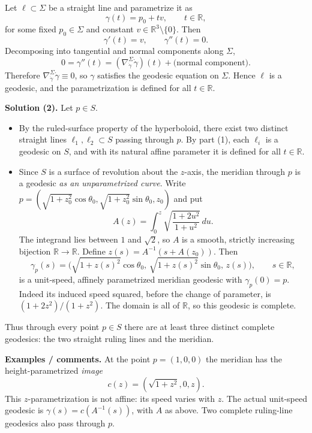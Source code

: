 \begin{solution}
Let $\ell\subset\Sigma$ be a straight line and parametrize it as
	\[
	\gamma(t) = p_0 + t v,\qquad t\in\mathbb R,
	\]
	for some fixed $p_0\in\Sigma$ and constant $v\in\mathbb R^3\setminus\{0\}$.
	Then
	\[
	\gamma'(t)=v,\qquad \gamma''(t)=0.
	\]
	Decomposing into tangential and normal components along $\Sigma$,
	\[
	0 = \gamma''(t) = (\nabla^{\Sigma}_{\dot\gamma}\dot\gamma)(t)
	+ \text{(normal component)}.
	\]
	Therefore $\nabla^{\Sigma}_{\dot\gamma}\dot\gamma\equiv0$, so $\gamma$ satisfies
	the geodesic equation on $\Sigma$. Hence $\ell$ is a geodesic, and the
	parametrization is defined for all $t\in\mathbb R$.
	
	\medskip
	\textbf{Solution (2).}
	Let $p\in S$.
	\begin{itemize}
		\item By the ruled-surface property of the hyperboloid, there exist two
		distinct straight lines $\ell_1,\ell_2\subset S$ passing through $p$.
		By part (1), each $\ell_i$ is a geodesic on $S$, and with its natural
		affine parameter it is defined for all $t\in\mathbb R$.
		\item Since $S$ is a surface of revolution about the $z$-axis, the
		meridian through $p$ is a geodesic \emph{as an unparametrized curve}.
		Write $p=(\sqrt{1+z_0^2}\cos\theta_0,
		\sqrt{1+z_0^2}\sin\theta_0,z_0)$ and put
		\[
		A(z)=\int_0^z \sqrt{\frac{1+2u^2}{1+u^2}}\,du.
		\]
		The integrand lies between $1$ and $\sqrt2$, so $A$ is a smooth,
		strictly increasing bijection $\mathbb R\to\mathbb R$.
		Define $z(s)=A^{-1}(s+A(z_0))$.  Then
		\[
		\gamma_p(s)=\bigl(\sqrt{1+z(s)^2}\cos\theta_0,\,
		\sqrt{1+z(s)^2}\sin\theta_0,\,z(s)\bigr),
		\qquad s\in\mathbb R,
		\]
		is a unit-speed, affinely parametrized meridian geodesic with
		$\gamma_p(0)=p$.  Indeed its induced speed squared, before the
		change of parameter, is $(1+2z^2)/(1+z^2)$.
		The domain is all of $\mathbb R$, so this geodesic is complete.
	\end{itemize}
	Thus through every point $p\in S$ there are at least three distinct complete
	geodesics: the two straight ruling lines and the meridian.
	
	\medskip
	\textbf{Examples / comments.}
	At the point $p=(1,0,0)$ the meridian has the height-parametrized
	\emph{image}
	\[
	c(z)=(\sqrt{1+z^2},0,z).
	\]
	This $z$-parametrization is not affine: its speed varies with $z$.
	The actual unit-speed geodesic is $\gamma(s)=c(A^{-1}(s))$, with
	$A$ as above.  Two complete ruling-line geodesics also pass through $p$.
	

\end{solution}

